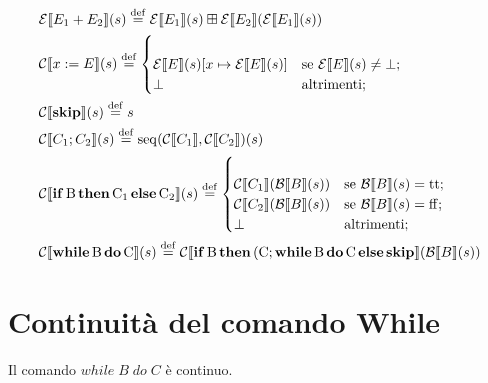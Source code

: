 \begin{align*}
&\denot{\calE}{E_1 + E_2}{s} \defeq \denot{\calE}{E_1}{s} \conadd \denot{\calE}{E_2}{\denot{\calE}{E_1}{s}}\\
&\denot{\calC}{x \weq E}{s} \defeq \begin{cases}\\
	\assign{\denot{\calE}{E}{s}}{x}{\denot{\calE}{E}{s}} & \text{se } \denot{\calE}{E}{s} \neq \bot;\\
	\bot & \text{altrimenti};
	\end{cases}\\
&\denot{\calC}{\kw{skip}}{s} \defeq s\\
&\denot{\calC}{C_1 ; C_2}{s} \defeq \mathrm{seq}(\calC \llbracket C_1 \rrbracket, \calC \llbracket C_2 \rrbracket)(s)\\
&\denot{\calC}{\condif{B}{C_1}{C_2}}{s} \defeq \begin{cases}\\
	\denot{\calC}{C_1}{\denot{\calB}{B}{s}} & \text{se } \denot{\calB}{B}{s} = \ttv ;\\
	\denot{\calC}{C_2}{\denot{\calB}{B}{s}} & \text{se } \denot{\calB}{B}{s} = \ffv ;\\
	\bot & \text{altrimenti};
	\end{cases}\\
&\denot{\calC}{\while{B}{C}}{s} \defeq \denot{\calC}{\condif{B}{(C ; \while{B}{C}}{\kw{skip}}}{\denot{\calB}{B}{s}}
\end{align*}

\section{Continuità del comando While}
Il comando $ while\; B\; do\; C $ è continuo.

